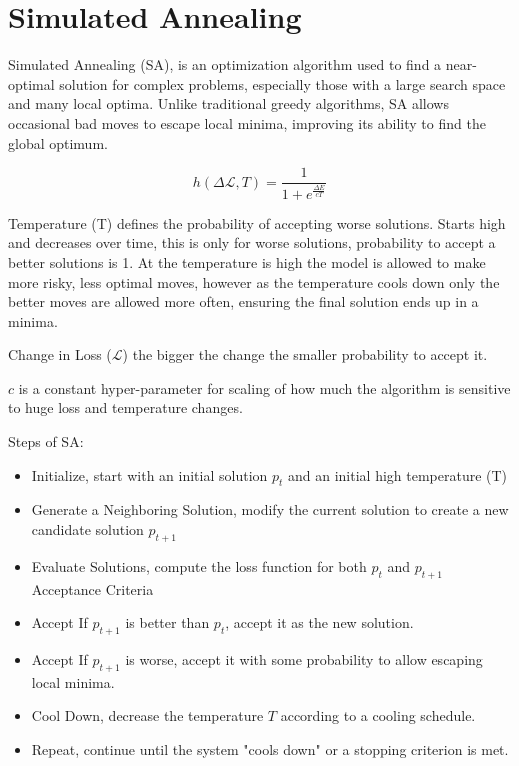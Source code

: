 \documentclass{article}
\begin{document}
    \section{Simulated Annealing}

    Simulated Annealing (SA), is an optimization algorithm used to find a near-optimal solution for complex problems, especially those with a large search space and many local optima. Unlike traditional greedy algorithms, SA allows occasional bad moves to escape local minima, improving its ability to find the global optimum.

    \begin{equation}
        h\left(\Delta \mathcal L, T\right) = \frac{1}{1 + e^{\frac{\Delta E}{cT}}}
    \end{equation}

    Temperature (T) defines the probability of accepting worse solutions.
    Starts high and decreases over time, this is only for worse solutions, probability to accept a better solutions is 1.
    At the temperature is high the model is allowed to make more risky, less optimal moves, however as the temperature cools down only the better moves are allowed more often, ensuring the final solution ends up in a minima.

    Change in Loss ($\mathcal L$) the bigger the change the smaller probability to accept it.

    $c$ is a constant hyper-parameter for scaling of how much the algorithm is sensitive to huge loss and temperature changes.

    Steps of SA:
    \begin{itemize}
        \item Initialize, start with an initial solution $p_t$ and an initial high temperature (T)
        \item Generate a Neighboring Solution, modify the current solution to create a new candidate solution $p_{t+1}$
        \item Evaluate Solutions, compute the loss function for both $p_t$ and $p_{t+1}$
        Acceptance Criteria
        \item Accept If $p_{t+1}$ is better than $p_t$, accept it as the new solution.
        \item Accept If $p_{t+1}$ is worse, accept it with some probability to allow escaping local minima.
        \item Cool Down, decrease the temperature $T$ according to a cooling schedule.
        \item Repeat, continue until the system "cools down" or a stopping criterion is met.
    \end{itemize}
\end{document}

